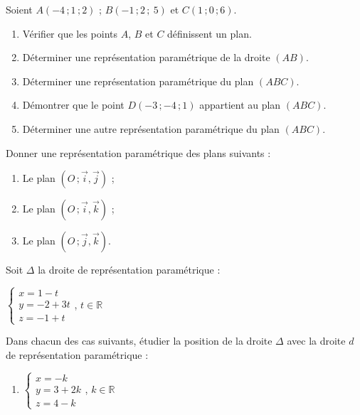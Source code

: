 \begin{colonne*exercice}

\begin{exercice}
  Soient $A(-4\,;1\,; 2)$ ; $B(-1\,; 2\,;\ 5)$ et $C(1\,; 0 \,; 6)$.
  \begin{enumerate}
  \item Vérifier que les points $A$, $B$ et $C$ définissent un plan.
  \item Déterminer une représentation paramétrique de la droite
    $(AB)$.
  \item Déterminer une représentation paramétrique du plan $(ABC)$.
  \item Démontrer que le point $D(-3\,;-4\,;1)$ appartient au plan
    $(ABC)$.
  \item Déterminer une autre représentation paramétrique du plan
    $(ABC)$.
  \end{enumerate}
\end{exercice}

\begin{exercice}
  Donner une représentation paramétrique des plans suivants :
  \begin{enumerate}
  \item Le plan $(O\,;\overrightarrow{i},\overrightarrow{j})$ ;
  \item Le plan $(O\,;\overrightarrow{i},\overrightarrow{k})$ ;
  \item Le plan $(O\,;\overrightarrow{j},\overrightarrow{k})$.
  \end{enumerate}
\end{exercice}
 
\begin{exercice*}\label{ex52G2}
  Soit $\Delta$ la droite de représentation paramétrique :

  \begin{center}
    $\begin{cases}x=1-t \\y=-2+3t \\z=-1+t \end{cases}$,
    $t\in\mathbb{R}$
  \end{center}

  Dans chacun des cas suivants, étudier la position de la droite
  $\Delta$ avec la droite $d$ de représentation paramétrique :
  \begin{enumerate}
  \item \begin{center}
      $\begin{cases}x=-k \\y=3+2k \\z=4-k \end{cases}$,
      $k\in\mathbb{R}$\\[3mm]
    \end{center}


\end{enumerate}
\end{exercice*}
\end{colonne*exercice}
